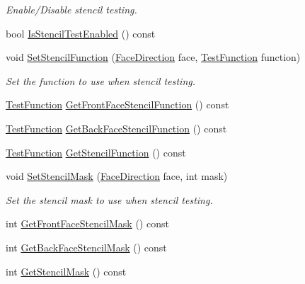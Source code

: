 \begin{DoxyCompactItemize}
\begin{DoxyCompactList}\small\item\em Enable/\+Disable stencil testing. \end{DoxyCompactList}\item 
bool \hyperlink{class_g_f_w_1_1_context_state_ac93b9f2c0fc99226c1a14818d45eafd0}{Is\+Stencil\+Test\+Enabled} () const
\item 
void \hyperlink{class_g_f_w_1_1_context_state_ad898aef17c3c1e30cfaa5290a965ce7a}{Set\+Stencil\+Function} (\hyperlink{namespace_g_f_w_a393ef12f1927ff3e7b73b11f72d551eb}{Face\+Direction} face, \hyperlink{namespace_g_f_w_a2eabb5a646179bceaab2d5e3bfce2316}{Test\+Function} function)
\begin{DoxyCompactList}\small\item\em Set the function to use when stencil testing. \end{DoxyCompactList}\item 
\hyperlink{namespace_g_f_w_a2eabb5a646179bceaab2d5e3bfce2316}{Test\+Function} \hyperlink{class_g_f_w_1_1_context_state_a35a9f2abcdd97e409ede000f9338b256}{Get\+Front\+Face\+Stencil\+Function} () const
\item 
\hyperlink{namespace_g_f_w_a2eabb5a646179bceaab2d5e3bfce2316}{Test\+Function} \hyperlink{class_g_f_w_1_1_context_state_a8ec8b1992b1c9247c908a40e40ef1faa}{Get\+Back\+Face\+Stencil\+Function} () const
\item 
\hyperlink{namespace_g_f_w_a2eabb5a646179bceaab2d5e3bfce2316}{Test\+Function} \hyperlink{class_g_f_w_1_1_context_state_a7ddf3257ec54d4fb039e8873ae493836}{Get\+Stencil\+Function} () const
\item 
void \hyperlink{class_g_f_w_1_1_context_state_a110e8f561931a8ce5c37feb3d7f53c89}{Set\+Stencil\+Mask} (\hyperlink{namespace_g_f_w_a393ef12f1927ff3e7b73b11f72d551eb}{Face\+Direction} face, int mask)
\begin{DoxyCompactList}\small\item\em Set the stencil mask to use when stencil testing. \end{DoxyCompactList}\item 
int \hyperlink{class_g_f_w_1_1_context_state_ad60fd3436d99fe95a85bff52d21d741b}{Get\+Front\+Face\+Stencil\+Mask} () const
\item 
int \hyperlink{class_g_f_w_1_1_context_state_a00c3e1b3984204d8a23d56dcc57bead5}{Get\+Back\+Face\+Stencil\+Mask} () const
\item 
int \hyperlink{class_g_f_w_1_1_context_state_ad4a8a7a19848145d39bec3de746de41c}{Get\+Stencil\+Mask} () const

\end{DoxyCompactItemize}
